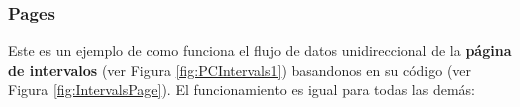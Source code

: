 \documentclass[12pt,twoside,titlepage]{report}
\begin{document}

\subsubsection{Pages}




Este es un ejemplo de como funciona el flujo de datos unidireccional de la \textbf{página de intervalos} (ver Figura \ref{fig:PCIntervals1}) basandonos en su código (ver Figura \ref{fig:IntervalsPage}). El funcionamiento es igual para todas las demás: 
\end{document}
